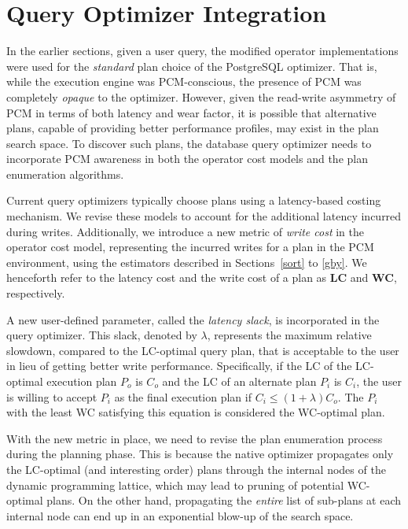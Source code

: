 \documentclass{article}
\begin{document}
\section{Query Optimizer Integration} \label{integration}

In the earlier sections, given a user query, the modified operator
implementations were used for the \emph{standard} plan choice of the PostgreSQL
optimizer. That is, while the execution engine was PCM-conscious, the presence
of PCM was completely \emph{opaque} to the optimizer.  However, given the
read-write asymmetry of PCM in terms of both latency and wear factor, it is
possible that alternative plans, capable of providing better performance
profiles, may exist in the plan search space. To discover such plans, the
database query optimizer needs to incorporate PCM awareness in both the
operator cost models and the plan enumeration algorithms.

Current query optimizers typically choose plans using a latency-based costing
mechanism. We revise these models to account for the additional latency
incurred during writes. Additionally, we introduce a new metric of \emph{write
cost} in the operator cost model, representing the incurred writes for a plan
in the PCM environment, using the estimators described in Sections~\ref{sort}
to \ref{gby}.  We henceforth refer to the latency cost and the write cost of a
plan as {\bf LC} and {\bf WC}, respectively.

A new user-defined parameter, called the \emph{latency slack}, is incorporated
in the query optimizer.  This slack, denoted by $\lambda$, represents the
maximum relative slowdown, compared to the LC-optimal query plan, that is
acceptable to the user in lieu of getting better write performance.
Specifically, if the LC of the LC-optimal execution plan $P_o$ is $C_o$ and the
LC of an alternate plan $P_i$ is $C_i$, the user is willing to accept $P_i$ as
the final execution plan if $C_i \le (1+\lambda) C_o$. The $P_i$ with the least
WC satisfying this equation is considered the WC-optimal plan.

With the new metric in place, we need to revise the plan enumeration process
during the planning phase. This is because the native optimizer propagates only
the LC-optimal (and interesting order) plans through the internal nodes of the
dynamic programming lattice, which may lead to pruning of potential WC-optimal
plans. On the other hand, propagating the \emph{entire} list of sub-plans at
each internal node can end up in an exponential blow-up of the search space.  
\end{document}
